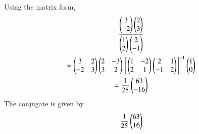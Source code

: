 %
Using the matrix form, 
\begin{multline}
\frac{\myvec{3 \\ -2}\myvec{2 \\ 3}}{\myvec{1 \\ 2}\myvec{2 \\ -1}}
\\
= \myvec{3 & 2\\-2 & 3 }\myvec{2 & -3 \\3 & 2}\sbrak{\myvec{1 & -2\\2 & 1}\myvec{2 & 1\\-1 & 2}}^{-1}\myvec{1\\0}
\\
=\frac{1}{25}\myvec{63 \\ -16}
\end{multline}
The conjugate is given by 
\begin{align}
\frac{1}{25}\myvec{63 \\ 16}
\end{align}



